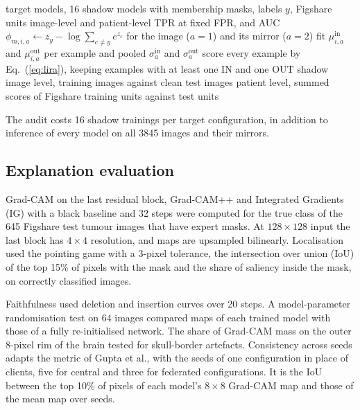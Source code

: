 \documentclass[preprint,12pt]{elsarticle}
\begin{document}
\begin{algorithm}[!t]
\caption{Online LiRA at image and patient level}\label{alg:lira}
\small
\begin{algorithmic}[1]
\Require target models, 16 shadow models with membership masks, labels $y$, Figshare units
\Ensure image-level and patient-level TPR at fixed FPR, and AUC
  \State $\phi_{m,i,a}\gets z_y-\log\sum_{c\ne y}e^{z_c}$ for the image ($a=1$) and its mirror ($a=2$)
\EndFor
\State fit $\mu^{\mathrm{in}}_{i,a}$ and $\mu^{\mathrm{out}}_{i,a}$ per example and pooled $\sigma^{\mathrm{in}}_a$ and $\sigma^{\mathrm{out}}_a$
  \State score every example by Eq.~(\ref{eq:lira}), keeping examples with at least one IN and one OUT shadow
  \State image level, training images against clean test images
  \State patient level, summed scores of Figshare training units against test units
\EndFor
\end{algorithmic}
\end{algorithm}

The audit costs 16 shadow trainings per target configuration, in addition to inference of every model on all 3845
images and their mirrors.

\subsection{Explanation evaluation}
Grad-CAM\cite{selvaraju2017} on the last residual block, Grad-CAM++\cite{chattopadhay2018} and Integrated Gradients
(IG)\cite{sundararajan2017} with a black baseline and 32 steps were computed for the true class of the 645 Figshare
test tumour images that have expert masks. At $128\times128$ input the last block has $4\times4$ resolution, and maps
are upsampled bilinearly. Localisation used the pointing game with a 3-pixel tolerance, the intersection over union
(IoU) of the top 15\% of pixels with the mask and the share of saliency inside the mask, on correctly classified
images.

Faithfulness used deletion and insertion curves over 20 steps.\cite{petsiuk2018} A model-parameter randomisation
test\cite{adebayo2018} on 64 images compared maps of each trained model with those of a fully re-initialised network.
The share of Grad-CAM mass on the outer 8-pixel rim of the brain tested for skull-border artefacts. Consistency
across seeds adapts the metric of Gupta et al.,\cite{gupta2026} with the seeds of one configuration in place of
clients, five for central and three for federated configurations. It is the IoU between the top 10\% of pixels of each
model's $8\times8$ Grad-CAM map and those of the mean map over seeds.
\end{document}
